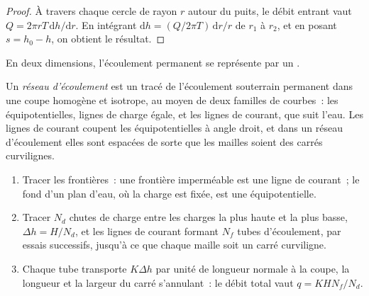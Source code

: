 \begin{proof}
À travers chaque cercle de rayon $r$ autour du puits, le débit entrant vaut $Q = 2\pi r
T\,\mathrm dh/\mathrm dr$. En intégrant $\mathrm dh = (Q/2\pi T)\,\mathrm
dr/r$ de $r_1$ à $r_2$, et en posant $s = h_0 - h$, on obtient le résultat.
\end{proof}

En deux dimensions, l'écoulement permanent se représente par un .

\begin{definition}\label{def:b3:hydrogeology:flow-net}
Un \emph{réseau d'écoulement} est un tracé de l'écoulement souterrain permanent dans
une coupe homogène et isotrope, au moyen de deux familles de courbes~: les équipotentielles,
lignes de charge égale, et les lignes de courant, que suit l'eau. Les
lignes de courant coupent les équipotentielles à angle droit, et dans un réseau
d'écoulement elles sont espacées de sorte que les mailles soient des carrés curvilignes.
\end{definition}

\begin{method}\label{met:b3:hydrogeology:flow-net}
\leavevmode
\begin{enumerate}
\item Tracer les frontières~: une frontière imperméable est une ligne de courant~; le fond
  d'un plan d'eau, où la charge est fixée, est une équipotentielle.
\item Tracer $N_d$ chutes de charge entre les charges la plus haute et la plus basse, $\Delta h
  = H/N_d$, et les lignes de courant formant $N_f$ tubes d'écoulement, par essais
  successifs, jusqu'à ce que chaque maille soit un carré curviligne.
\item Chaque tube transporte $K\Delta h$ par unité de longueur normale à la
  coupe, la longueur et la largeur du carré s'annulant~: le débit total vaut $q =
  KHN_f/N_d$.
\end{enumerate}
\end{method}

